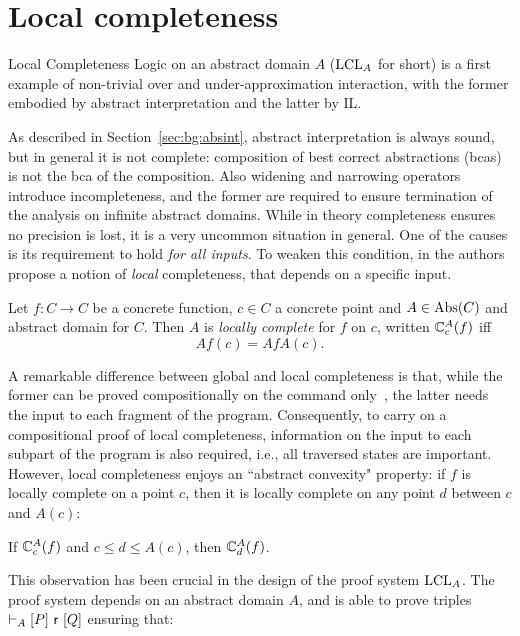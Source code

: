 \section{Local completeness}\label{sec:sota:lcl}
Local Completeness Logic on an abstract domain $A$ ($\text{LCL}_A$ for short) \cite{BGGR21} is a first example of non-trivial over and under-approximation interaction, with the former embodied by abstract interpretation and the latter by IL.

As described in Section~\ref{sec:bg:absint}, abstract interpretation is always sound, but in general it is not complete: composition of best correct abstractions (bcas) is not the bca of the composition. Also widening and narrowing operators introduce incompleteness, and the former are required to ensure termination of the analysis on infinite abstract domains. While in theory completeness ensures no precision is lost, it is a very uncommon situation in general. One of the causes is its requirement to hold \emph{for all inputs}. To weaken this condition, in \cite{BGGR21} the authors propose a notion of \emph{local} completeness, that depends on a specific input.
\begin{definition}
	Let $f: C \rightarrow C$ be a concrete function, $c \in C$ a concrete point and $A \in \text{\normalfont Abs}(C)$ and abstract domain for $C$. Then $A$ is \emph{locally complete} for $f$ on $c$, written $\mathbb{C}^{A}_{c}(f)$ iff
	\[
	Af(c) = AfA(c) .
	\]
\end{definition}

A remarkable difference between global and local completeness is that, while the former can be proved compositionally on the command only~\cite{GLR15}, the latter needs the input to each fragment of the program. Consequently, to carry on a compositional proof of local completeness, information on the input to each subpart of the program is also required, i.e., all traversed states are important. However, local completeness enjoys an ``abstract convexity" property: if $f$ is locally complete on a point $c$, then it is locally complete on any point $d$ between $c$ and $A(c)$:

\begin{lemma}\label{lmm:sota:abstract-convexity}
	If $\mathbb{C}^{A}_{c}(f)$ and $c \le d \le A(c)$, then $\mathbb{C}^{A}_{d}(f)$.
\end{lemma}

This observation has been crucial in the design of the proof system $\text{LCL}_A$. The proof system depends on an abstract domain $A$, and is able to prove triples $\vdash_{A}\nobreak[P]~\mathsf{r}~[Q]$  ensuring that:

